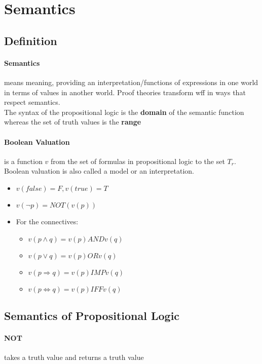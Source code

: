     \section{Semantics}
      \subsection{Definition}
      \paragraph{Semantics} means meaning, providing an interpretation/functions of
        expressions in one world in terms of values in another world. Proof
        theories transform wff in ways that respect semantics.\\
        The syntax of the propositional logic is the \textbf{domain} of the
        semantic function whereas the set of truth values is the \textbf{range}

        \paragraph{Boolean Valuation} is a function $v$ from the set of
        formulas in propositional logic to the set $T_r$. Boolean valuation is
        also called a model or an interpretation.
        \begin{itemize}
          \item $v(false) = F, v(true) = T$
          \item $v(\lnot p) = NOT (v(p))$
          \item For the connectives:
          \begin{itemize}
            \item $v(p\land q) = v(p) AND v(q)$
            \item $v(p\lor q) = v(p) OR v(q)$
            \item $v(p\Rightarrow q) = v(p) IMP v(q)$
            \item $v(p\Leftrightarrow q) = v(p) IFF v(q)$
          \end{itemize}
        \end{itemize}

      \subsection{Semantics of Propositional Logic}
        \paragraph{NOT} takes a truth value and returns a truth value
